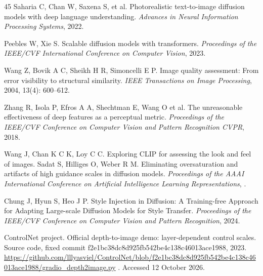 \documentclass[times,twocolumn,final]{elsarticle}
\providecommand{\DIFadd}[1]{{\protect\color{blue} \sf #1}} %
\providecommand{\DIFdel}[1]{{\protect\color{red} \scriptsize #1}} %
\providecommand{\DIFaddbegin}{} %
\providecommand{\DIFaddend}{} %
\providecommand{\DIFdelbegin}{} %
\providecommand{\DIFdelend}{} %
\begin{document}
\begin{thebibliography}{45}
\DIFdel{Saharia C, Chan W, Saxena S, et al. Photorealistic text-to-image diffusion models with deep language understanding. \textit{Advances in Neural Information Processing Systems}, 2022.
}%

\DIFdel{Peebles W, Xie S. Scalable diffusion models with transformers. \textit{Proceedings of the IEEE/CVF International Conference on Computer Vision}, 2023.
}%

\DIFdelend {}
Wang Z, Bovik A C, Sheikh H R, Simoncelli E P. Image quality assessment: From error visibility to structural similarity. \textit{IEEE Transactions on Image Processing}, 2004, 13(4): 600--612.

Zhang R, Isola P, Efros A A, \DIFdelbegin \DIFdel{Shechtman E, Wang O}\DIFdelend \DIFaddbegin \DIFadd{et al}\DIFaddend . The unreasonable effectiveness of deep features as a perceptual metric. \textit{\DIFdelbegin \DIFdel{Proceedings of the IEEE/CVF Conference on Computer Vision and Pattern Recognition}\DIFdelend \DIFaddbegin \DIFadd{CVPR}\DIFaddend }, 2018.

\DIFdelbegin %
\DIFdel{Wang J, Chan K C K, Loy C C. Exploring CLIP for assessing the look and feel of images. }\DIFdelend \DIFaddbegin {}
\DIFadd{Sadat S, Hilliges O, Weber R M. Eliminating oversaturation and artifacts of high guidance scales in diffusion models. }\DIFaddend \textit{\DIFdelbegin \DIFdel{Proceedings of the AAAI }\DIFdelend \DIFaddbegin \DIFadd{International }\DIFaddend Conference on \DIFdelbegin \DIFdel{Artificial Intelligence}\DIFdelend \DIFaddbegin \DIFadd{Learning Representations}\DIFaddend }, \DIFaddbegin \DIFadd{2025.
}

\DIFadd{Chung J, Hyun S, Heo J P. Style Injection in Diffusion: A Training-free Approach for Adapting Large-scale Diffusion Models for Style Transfer. \textit{Proceedings of the IEEE/CVF Conference on Computer Vision and Pattern Recognition}, 2024.
}

\DIFadd{ControlNet project. Official depth-to-image demo: layer-dependent control scales. Source code, fixed commit f2e1bc38dc8d925fb542be4c138c46013ace1988, }\DIFaddend 2023. \DIFaddbegin \url{https://github.com/lllyasviel/ControlNet/blob/f2e1bc38dc8d925fb542be4c138c46013ace1988/gradio_depth2image.py}\DIFadd{. Accessed 12 October 2026.
}\DIFaddend 


\end{thebibliography}
\end{document}
